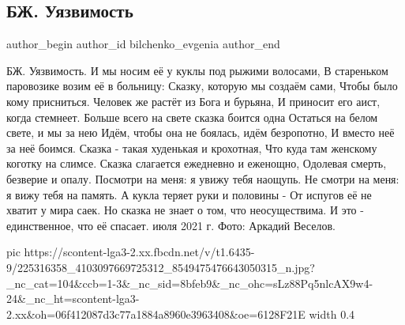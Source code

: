 
 
 
 
 
 
\subsection{БЖ. Уязвимость}
\label{sec:28_07_2021.fb.bilchenko_evgenia.3.ujazvimost}
 
\ifcmt
 author_begin
   author_id bilchenko_evgenia
 author_end
\fi

\begin{multicols}{2}
\obeycr
БЖ. Уязвимость.
\smallskip
И мы носим её у куклы под рыжими волосами,
В стареньком паровозике возим её в больницу:
Сказку, которую мы создаём сами,
Чтобы было кому присниться.
\smallskip
Человек же растёт из Бога и бурьяна,
И приносит его аист, когда стемнеет.
Больше всего на свете сказка боится одна
Остаться на белом свете, и мы за нею
\smallskip
Идём, чтобы она не боялась, идём безропотно,
И вместо неё за неё боимся.
Сказка - такая худенькая и крохотная,
Что куда там женскому коготку на слимсе.
\smallskip
Сказка слагается ежедневно и еженощно,
Одолевая смерть, безверие и опалу.
Посмотри на меня: я увижу тебя наощупь.
Не смотри на меня: я вижу тебя на память.
\smallskip
А кукла теряет руки и половины -
От испугов её не хватит у мира саек.
Но сказка не знает о том, что неосуществима.
И это - единственное, что её спасает.
 июля 2021 г.
\smallskip
Фото: Аркадий Веселов.
\restorecr
\end{multicols}

\ifcmt
  pic https://scontent-lga3-2.xx.fbcdn.net/v/t1.6435-9/225316358_4103097669725312_8549475476643050315_n.jpg?_nc_cat=104&ccb=1-3&_nc_sid=8bfeb9&_nc_ohc=sLz88Pq5nlcAX9w4-24&_nc_ht=scontent-lga3-2.xx&oh=06f412087d3c77a1884a8960e3963408&oe=6128F21E
  width 0.4
\fi



